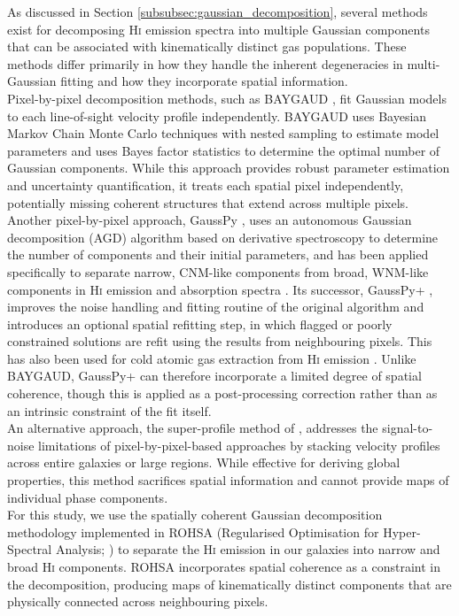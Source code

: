 As discussed in Section \ref{subsubsec:gaussian_decomposition}, several methods exist for decomposing \textrm{H\textsc{i}} emission spectra into multiple Gaussian components that can be associated with kinematically distinct gas populations. These methods differ primarily in how they handle the inherent degeneracies in multi-Gaussian fitting and how they incorporate spatial information.\\\indent
Pixel-by-pixel decomposition methods, such as BAYGAUD \citep{Oh2019}, fit Gaussian models to each line-of-sight velocity profile independently. BAYGAUD uses Bayesian Markov Chain Monte Carlo techniques with nested sampling to estimate model parameters and uses Bayes factor statistics to determine the optimal number of Gaussian components. While this approach provides robust parameter estimation and uncertainty quantification, it treats each spatial pixel independently, potentially missing coherent structures that extend across multiple pixels. Another pixel-by-pixel approach, GaussPy \citep{Lindner2015}, uses an autonomous Gaussian decomposition (AGD) algorithm based on derivative spectroscopy to determine the number of components and their initial parameters, and has been applied specifically to separate narrow, CNM-like components from broad, WNM-like components in \textrm{H\textsc{i}} emission and absorption spectra \citep{Murray2017, Murray2018}. Its successor, GaussPy+ \citep{Riener2019}, improves the noise handling and fitting routine of the original algorithm and introduces an optional spatial refitting step, in which flagged or poorly constrained solutions are refit using the results from neighbouring pixels. This has also been used for cold atomic gas extraction from \textrm{H\textsc{i}} emission \citep{Syed2023}. Unlike BAYGAUD, GaussPy+ can therefore incorporate a limited degree of spatial coherence, though this is applied as a post-processing correction rather than as an intrinsic constraint of the fit itself. \\\indent
An alternative approach, the super-profile method of \citet{Ianjamasimanana2012}, addresses the signal-to-noise limitations of pixel-by-pixel-based approaches by stacking velocity profiles across entire galaxies or large regions. While effective for deriving global properties, this method sacrifices spatial information and cannot provide maps of individual phase components.\\\indent
For this study, we use the spatially coherent Gaussian decomposition methodology implemented in ROHSA (Regularised Optimisation for Hyper-Spectral Analysis; \citealt{Marchal2019}) to separate the \textrm{H\textsc{i}} emission in our galaxies into narrow and broad \textrm{H\textsc{i}} components. ROHSA incorporates spatial coherence as a constraint in the decomposition, producing maps of kinematically distinct components that are physically connected across neighbouring pixels. 
